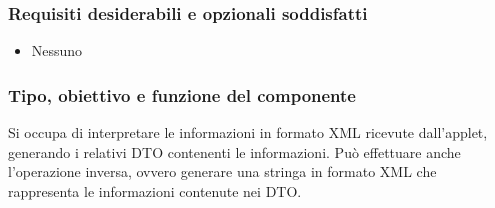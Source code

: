 \subsubsection*{Requisiti desiderabili e opzionali soddisfatti}
\begin{itemize}
    \item Nessuno
\end{itemize}
\subsubsection*{Tipo, obiettivo e funzione del componente}
Si occupa di interpretare le informazioni in formato XML ricevute dall'applet,
generando i relativi DTO contenenti le informazioni. Pu\`o effettuare anche
l'operazione inversa, ovvero generare una stringa in formato XML che rappresenta
le informazioni contenute nei DTO.
